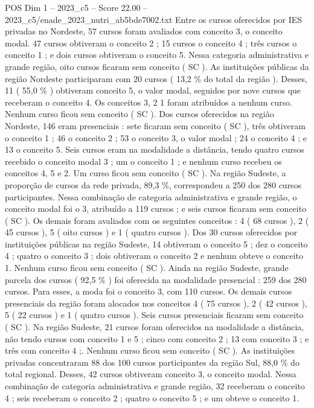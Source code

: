 \begin{textsample}{POS Dim 1 – 2023\_c5 – Score 22.00 – 2023\_c5/enade\_2023\_nutri\_ab5bde7002.txt}
Entre os cursos oferecidos por IES privadas no Nordeste, 57 cursos foram avaliados com conceito 3, o conceito modal. 47 cursos obtiveram o conceito 2 ; 15 cursos o conceito 4 ; três cursos o conceito 1 ; e dois cursos obtiveram o conceito 5.
Nessa categoria administrativa e grande região, oito cursos ficaram sem conceito ( SC ).
As instituições públicas da região Nordeste participaram com 20 cursos ( 13,2 \% do total da região ).
Desses, 11 ( 55,0 \% ) obtiveram conceito 5, o valor modal, seguidos por nove cursos que receberam o conceito 4.
Os conceitos 3, 2 1 foram atribuídos a nenhum curso.
Nenhum curso ficou sem conceito ( SC ).
Dos cursos oferecidos na região Nordeste, 146 eram presenciais : sete ficaram sem conceito ( SC ), três obtiveram o conceito 1 ; 46 o conceito 2 ; 53 o conceito 3, o valor modal ; 24 o conceito 4 ; e 13 o conceito 5.
Seis cursos eram na modalidade a distância, tendo quatro cursos recebido o conceito modal 3 ; um o conceito 1 ; e nenhum curso recebeu os conceitos 4, 5 e 2.
Um curso ficou sem conceito ( SC ).
Na região Sudeste, a proporção de cursos da rede privada, 89,3 \%, correspondeu a 250 dos 280 cursos participantes.
Nessa combinação de categoria administrativa e grande região, o conceito modal foi o 3, atribuído a 119 cursos ; e seis cursos ficaram sem conceito ( SC ).
Os demais foram avaliados com os seguintes conceitos : 4 ( 68 cursos ), 2 ( 45 cursos ), 5 ( oito cursos ) e 1 ( quatro cursos ).
Dos 30 cursos oferecidos por instituições públicas na região Sudeste, 14 obtiveram o conceito 5 ; dez o conceito 4 ; quatro o conceito 3 ; dois obtiveram o conceito 2 e nenhum obteve o conceito 1.
Nenhum curso ficou sem conceito ( SC ).
Ainda na região Sudeste, grande parcela dos cursos ( 92,5 \% ) foi oferecida na modalidade presencial : 259 dos 280 cursos.
Para esses, a moda foi o conceito 3, com 110 cursos.
Os demais cursos presenciais da região foram alocados nos conceitos 4 ( 75 cursos ), 2 ( 42 cursos ), 5 ( 22 cursos ) e 1 ( quatro cursos ).
Seis cursos presenciais ficaram sem conceito ( SC ).
Na região Sudeste, 21 cursos foram oferecidos na modalidade a distância, não tendo cursos com conceito 1 e 5 ; cinco com conceito 2 ; 13 com conceito 3 ; e três com conceito 4 ;.
Nenhum curso ficou sem conceito ( SC ).
As instituições privadas concentraram 88 dos 100 cursos participantes da região Sul, 88,0 \% do total regional.
Desses, 42 cursos obtiveram conceito 3, o conceito modal.
Nessa combinação de categoria administrativa e grande região, 32 receberam o conceito 4 ; seis receberam o conceito 2 ; quatro o conceito 5 ; e um obteve o conceito 1.

\end{textsample}

